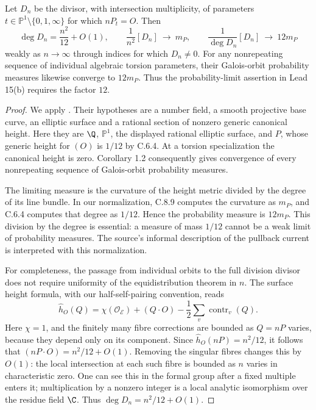 \begin{statement}
Let $D_n$ be the divisor, with intersection multiplicity, of
parameters $t\in\mathbb P^1\setminus\{0,1,\infty\}$ for which
$nP_t=O$. Then
\[
 \deg D_n=\frac{n^2}{12}+O(1),\qquad
 \frac1{n^2}[D_n]\ \longrightarrow\ m_P,\qquad
 \frac1{\deg D_n}[D_n]\ \longrightarrow\ 12m_P
\]
weakly as $n\to\infty$ through indices for which $D_n\ne0$.
For any nonrepeating sequence of individual algebraic torsion
parameters, their Galois-orbit probability measures likewise
converge to $12m_P$. Thus the probability-limit assertion
in Lead 15(b) requires the factor $12$.
\end{statement}
\begin{proof}
We apply \citet[Theorem 1.1 and Corollary 1.2]{demarco2017}.
Their hypotheses are a number field, a smooth projective
base curve, an elliptic surface and a rational section of
nonzero generic canonical height. Here they are $\Q$,
$\mathbb P^1$, the displayed rational elliptic surface,
and $P$, whose generic height for $(O)$ is $1/12$ by C.6.4.
At a torsion specialization the canonical height is zero.
Corollary 1.2 consequently gives convergence of every
nonrepeating sequence of Galois-orbit probability measures.

The limiting measure is the curvature of the height metric
divided by the degree of its line bundle. In our normalization,
C.8.9 computes the curvature as $m_P$, and C.6.4 computes
that degree as $1/12$. Hence the probability measure is
$12m_P$. This division by the degree is essential: a measure
of mass $1/12$ cannot be a weak limit of probability measures.
The source's informal description of the pullback current
is interpreted with this normalization.

For completeness, the passage from individual orbits to
the full division divisor does not require uniformity of
the equidistribution theorem in $n$. The surface height
formula, with our half-self-pairing convention, reads
\[
 \widehat h_O(Q)=\chi(\mathcal O_{\mathcal E})+(Q\cdot O)
                -\frac12\sum_v\operatorname{contr}_v(Q).
\]
Here $\chi=1$, and the finitely many fibre corrections are
bounded as $Q=nP$ varies, because they depend only on its
component. Since $\widehat h_O(nP)=n^2/12$, it follows
that $(nP\cdot O)=n^2/12+O(1)$. Removing the singular fibres
changes this by $O(1)$: the local intersection at each
such fibre is bounded as $n$ varies in characteristic zero.
One can see this in the formal group after a fixed
multiple enters it; multiplication by a nonzero integer
is a local analytic isomorphism over the residue field
$\C$. Thus $\deg D_n=n^2/12+O(1)$.


\end{proof}
